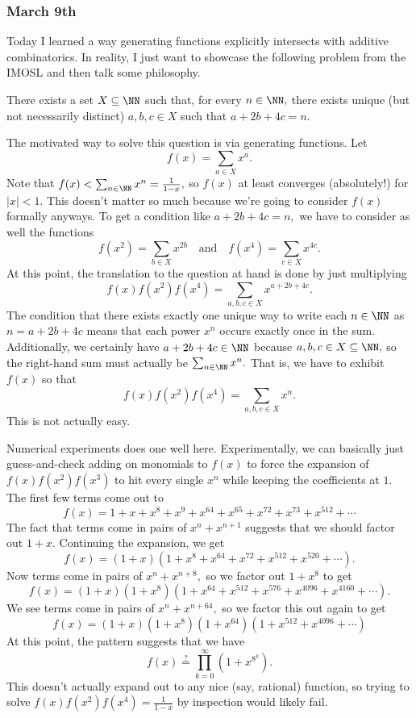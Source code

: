 \subsubsection{March 9th}
Today I learned a way generating functions explicitly intersects with additive combinatorics. In reality, I just want to showcase the following problem from the IMOSL and then talk some philosophy.
\begin{proposition}
    There exists a set $X\subseteq\NN$ such that, for every $n\in\NN,$ there exists unique (but not necessarily distinct) $a,b,c\in X$ such that $a+2b+4c=n.$
\end{proposition}
The motivated way to solve this question is via generating functions. Let
\[f(x)=\sum_{a\in X}x^a.\]
Note that $f(x)<\sum_{n\in\NN}x^n=\frac1{1-x},$ so $f(x)$ at least converges (absolutely!) for $|x|<1.$ This doesn't matter so much because we're going to consider $f(x)$ formally anyways. To get a condition like $a+2b+4c=n,$ we have to consider as well the functions
\[f\left(x^2\right)=\sum_{b\in X}x^{2b}\quad\text{and}\quad f\left(x^4\right)=\sum_{c\in X}x^{4c}.\]
At this point, the translation to the question at hand is done by just multiplying
\[f(x)f\left(x^2\right)f\left(x^4\right)=\sum_{a,b,c\in X}x^{a+2b+4c}.\]
The condition that there exists exactly one unique way to write each $n\in\NN$ as $n=a+2b+4c$ means that each power $x^n$ occurs exactly once in the sum. Additionally, we certainly have $a+2b+4c\in\NN$ because $a,b,c\in X\subseteq\NN,$ so the right-hand sum must actually be $\sum_{n\in\NN}x^n.$ That is, we have to exhibit $f(x)$ so that
\[f(x)f\left(x^2\right)f\left(x^4\right)=\sum_{a,b,c\in X}x^n.\]
This is not actually easy.

Numerical experiments does one well here. Experimentally, we can basically just guess-and-check adding on monomials to $f(x)$ to force the expansion of $f(x)f\left(x^2\right)f\left(x^3\right)$ to hit every single $x^n$ while keeping the coefficients at $1.$ The first few terms come out to
\[f(x)=1+x+x^8+x^9+x^{64}+x^{65}+x^{72}+x^{73}+x^{512}+\cdots\]
The fact that terms come in pairs of $x^n+x^{n+1}$ suggests that we should factor out $1+x.$ Continuing the expansion, we get
\[f(x)=(1+x)\left(1+x^8+x^{64}+x^{72}+x^{512}+x^{520}+\cdots\right).\]
Now terms come in pairs of $x^n+x^{n+8},$ so we factor out $1+x^8$ to get
\[f(x)=(1+x)\left(1+x^8\right)\left(1+x^{64}+x^{512}+x^{576}+x^{4096}+x^{4160}+\cdots\right).\]
We see terms come in pairs of $x^n+x^{n+64},$ so we factor this out again to get
\[f(x)=(1+x)\left(1+x^8\right)\left(1+x^{64}\right)\left(1+x^{512}+x^{4096}+\cdots\right)\]
At this point, the pattern suggests that we have
\[f(x)\stackrel?=\prod_{k=0}^\infty\left(1+x^{8^k}\right).\]
This doesn't actually expand out to any nice (say, rational) function, so trying to solve $f(x)f\left(x^2\right)f\left(x^4\right)=\frac1{1-x}$ by inspection would likely fail.

